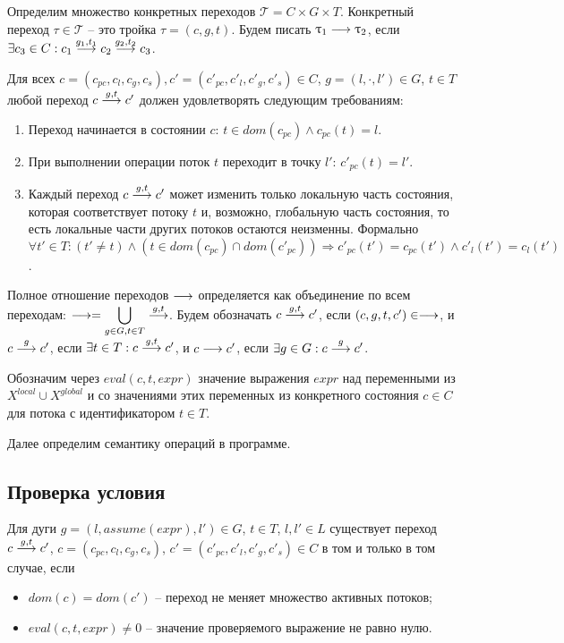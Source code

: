 Определим множество конкретных переходов $\mathcal{T}=C\times G \times T$.
Конкретный переход $\tau \in \mathcal{T}$ -- это тройка $\tau = (c, g, t)$. 
Будем писать $\uptau_1 \longrightarrow \uptau_2$, если $\exists c_3 \in C: c_1 \stackrel{g_1, t_1}{\longrightarrow} c_2 \stackrel{g_2, t_2}{\longrightarrow} c_3$.

Для всех $c=(c_{pc}, c_l, c_g, c_s), c'=(c'_{pc}, c'_l, c'_g, c'_s) \in C$, $g = (l, \cdot, l')\in G$, $t\in T$ любой переход $c \stackrel{g, t}{\longrightarrow} c'$ должен удовлетворять следующим требованиям:
\begin{enumerate}
\item Переход начинается в состоянии $c$: $t\in dom(c_{pc}) \land c_{pc}(t)=l$.
\item При выполнении операции поток $t$ переходит в точку $l'$: $c'_{pc}(t)=l'$.
\item Каждый переход $c \stackrel{g,t}{\longrightarrow} c'$ может изменить только локальную часть состояния, которая соответствует потоку $t$ и, возможно, глобальную часть состояния, то есть локальные части других потоков остаются неизменны.
Формально
$\forall t'\in T: (t'\neq t) \land (t \in dom(c_{pc})\cap dom(c'_{pc})) \Rightarrow c'_{pc}(t')=c_{pc}(t') \land c'_l(t')=c_l(t')$.
\end{enumerate}

Полное отношение переходов $\longrightarrow$ определяется как объединение по всем переходам: 
$\longrightarrow = \displaystyle\bigcup_{g \in G,t \in T} \stackrel{g,t}{\longrightarrow}$.
Будем обозначать $c \stackrel{g, t}{\longrightarrow} c'$, если $(c, g, t, c') \in \longrightarrow$, и
$c \stackrel{g}{\longrightarrow} c'$, если $\exists t\in T: c \stackrel{g,t}{\longrightarrow} c'$, и 
$c \longrightarrow c'$, если $\exists g\in G: c \stackrel{g}{\longrightarrow} c'$. 

Обозначим через $eval(c, t, expr)$ значение выражения $expr$ над переменными из $X^{local} \cup X^{global}$ и со значениями этих переменных из конкретного состояния $c \in C$ для потока с идентификатором $t \in T$. %

Далее определим семантику операций в программе.

\subsection{Проверка условия}
Для дуги $g = (l, assume(expr), l') \in G$, $t\in T$, $l, l' \in L$ существует переход $c \stackrel{g, t}{\longrightarrow} c'$, $c=(c_{pc}, c_l, c_g, c_s)$, $c'=(c'_{pc}, c'_l, c'_g, c'_s) \in C$ в том и только в том случае, если
\begin{itemize}
\item $dom(c)=dom(c')$ -- переход не меняет множество активных потоков;
\item $eval(c, t, expr) \neq 0$ -- значение проверяемого выражение не равно нулю.
\end{itemize}

